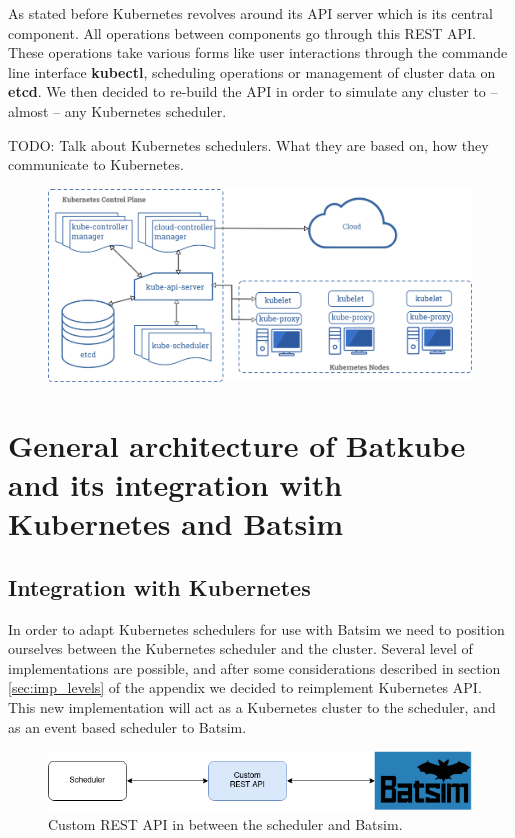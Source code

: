 As stated before Kubernetes revolves around its API server which is its central
component. All operations between components go through this REST API. These
operations take various forms like user interactions through the commande line
interface \textbf{kubectl}, scheduling operations or management of cluster data
on \textbf{etcd}. We then decided to re-build the API in order to simulate any
cluster to -- almost -- any Kubernetes scheduler.

TODO: Talk about Kubernetes schedulers. What they are based on, how they communicate to Kubernetes.

\begin{figure}[h]
	\centering
	\includegraphics[width=\textwidth]{./imgs/components-of-kubernetes.png}
	\label{fig:kube-components}
\end{figure}

\section{General architecture of Batkube and its integration with Kubernetes and Batsim}

\subsection{Integration with Kubernetes}

In order to adapt Kubernetes schedulers for use with Batsim we need to position
ourselves between the Kubernetes scheduler and the cluster. Several level of
implementations are possible, and after some considerations described in
section \ref{sec:imp_levels} of the appendix we decided to reimplement
Kubernetes API. This new implementation will act as a Kubernetes cluster to the
scheduler, and as an event based scheduler to Batsim.

\begin{figure}[h]
	\centering
	\includegraphics[width=\textwidth]{imgs/custom-restapi.png}
	\caption{Custom REST API in between the scheduler and Batsim.}
	\label{fig:custom-api}
\end{figure}

